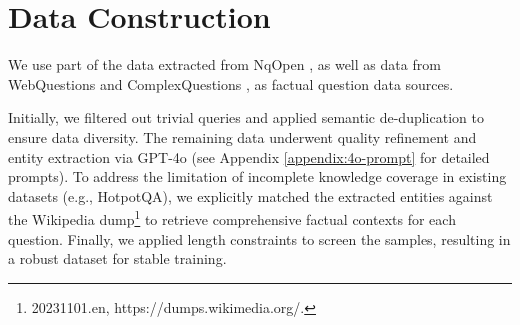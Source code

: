 \newpage




\section{Data Construction} %
\label{appendix:data-construction}

We use part of the data extracted from NqOpen \cite{kwiatkowski2019natural,lee2019latent}, as well as data from WebQuestions \citep{berant2013semantic} and ComplexQuestions \citep{bao2016constraint}, as factual question data sources.

Initially, we filtered out trivial queries and applied semantic de-duplication to ensure data diversity. 
The remaining data underwent quality refinement and entity extraction via GPT-4o (see Appendix \ref{appendix:4o-prompt} for detailed prompts).
To address the limitation of incomplete knowledge coverage in existing datasets (e.g., HotpotQA), we explicitly matched the extracted entities against the Wikipedia dump\footnote{20231101.en, https://dumps.wikimedia.org/.} to retrieve comprehensive factual contexts for each question. 
Finally, we applied length constraints to screen the samples, resulting in a robust dataset for stable training.

